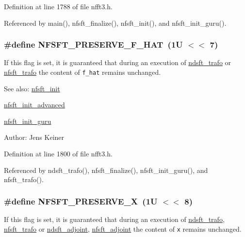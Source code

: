 Definition at line 1788 of file nfft3.h.

Referenced by main(), nfsft\_\-finalize(), nfsft\_\-init(), and nfsft\_\-init\_\-guru().\hypertarget{group__nfsft_ga31}{
\subsubsection[NFSFT\_\-PRESERVE\_\-F\_\-HAT]{\setlength{\rightskip}{0pt plus 5cm}\#define NFSFT\_\-PRESERVE\_\-F\_\-HAT~(1U $<$$<$ 7)}}
\label{group__nfsft_ga31}


If this flag is set, it is guaranteed that during an execution of \hyperlink{group__nfsft_ga6}{ndsft\_\-trafo} or \hyperlink{group__nfsft_ga8}{nfsft\_\-trafo} the content of {\tt f\_\-hat} remains unchanged. 

\begin{Desc}
\item[See also:]\hyperlink{group__nfsft_ga1}{nfsft\_\-init} 

\hyperlink{group__nfsft_ga2}{nfsft\_\-init\_\-advanced} 

\hyperlink{group__nfsft_ga3}{nfsft\_\-init\_\-guru} \end{Desc}
\begin{Desc}
\item[Author:]Jens Keiner \end{Desc}


Definition at line 1800 of file nfft3.h.

Referenced by ndsft\_\-trafo(), nfsft\_\-finalize(), nfsft\_\-init\_\-guru(), and nfsft\_\-trafo().\hypertarget{group__nfsft_ga32}{
\subsubsection[NFSFT\_\-PRESERVE\_\-X]{\setlength{\rightskip}{0pt plus 5cm}\#define NFSFT\_\-PRESERVE\_\-X~(1U $<$$<$ 8)}}
\label{group__nfsft_ga32}


If this flag is set, it is guaranteed that during an execution of \hyperlink{group__nfsft_ga6}{ndsft\_\-trafo}, \hyperlink{group__nfsft_ga8}{nfsft\_\-trafo} or \hyperlink{group__nfsft_ga7}{ndsft\_\-adjoint}, \hyperlink{group__nfsft_ga9}{nfsft\_\-adjoint} the content of {\tt x} remains unchanged. 

